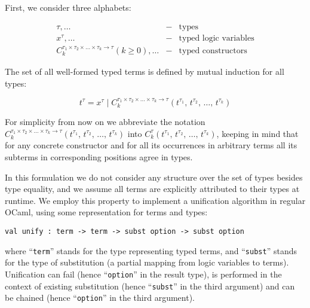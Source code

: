 First, we consider three alphabets:

\[
\begin{array}{rcl}
  \tau,\dots&-&\mbox{types}\\
  x^\tau,\dots&-&\mbox{typed logic variables}\\
  C_k^{\tau_1\times\tau_2\times\dots\times\tau_k\to\tau} (k\ge 0),\dots&-&\mbox{typed constructors}
\end{array}
\]

The set of all well-formed typed terms is defined by mutual induction for all types:

\[
t^\tau=x^\tau\mid C_k^{\tau_1\times\tau_2\times\dots\times\tau_k\to\tau}(t^{\tau_1},\,t^{\tau_2},\,\dots,\,t^{\tau_k})
\]

For simplicity from now on we abbreviate the notation $C_k^{\tau_1\times\tau_2\times\dots\times\tau_k\to\tau}(t^{\tau_1},\,t^{\tau_2},\,\dots,\,t^{\tau_k})$ into
$C_k^\tau(t^{\tau_1},\,t^{\tau_2},\,\dots,\,t^{\tau_k})$, keeping in mind that for any concrete constructor and for all its occurrences
in arbitrary terms all its subterms in corresponding positions agree in types.

\begin{comment}
We need also to define the notion of a subterm  $t^\tau[p]$ of a term $t^\tau$ at given position $p$:

$$
\begin{array}{rcl}
 p=\epsilon\mid\{1, 2, 3,\dots\}\bullet p&-&\mbox{the set of positions}\\
 t^\tau[\epsilon]=t^\tau&-&\mbox{base case}\\
 C_k^\tau(t_1^{\tau_1},\,t_2^{\tau_2},\dots,\,t_k^{\tau_k})[i\bullet p]=t_i^{\tau_i}[p], 1\le i \le k&-&\mbox{inductive case}
\end{array}
$$
\end{comment}

In this formulation we do not consider any structure over the set of types besides type equality, and we assume all terms are explicitly
attributed to their types at runtime. We employ this property to implement a unification algorithm in regular OCaml, using some
representation for terms and types:

\begin{lstlisting}[mathescape=true]
    val unify : term -> term -> subst option -> subst option
\end{lstlisting}

\noindent where ``\lstinline|term|'' stands for the type representing typed terms, and ``\lstinline|subst|'' stands for the type of
substitution (a partial mapping from logic variables to terms). Unification can fail (hence ``\lstinline|option|'' in the result type),
is performed in the context of existing substitution (hence ``\lstinline|subst|'' in the third argument) and can be
chained (hence ``\lstinline|option|'' in the third argument).

